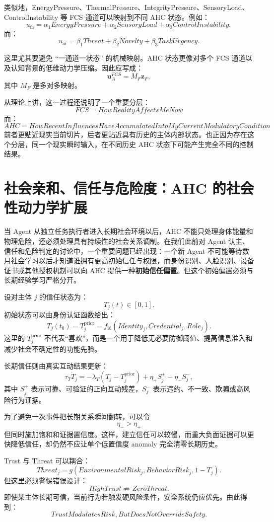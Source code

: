 类似地，EnergyPressure、ThermalPressure、IntegrityPressure、SensoryLoad、ControlInstability 等 FCS 通道可以映射到不同 AHC 状态。例如：
\[
u_{\mathrm{fa}}
=
\alpha_1
EnergyPressure
+
\alpha_2
SensoryLoad
+
\alpha_3
ControlInstability,
\]
而：
\[
u_{\mathrm{ar}}
=
\beta_1
Threat
+
\beta_2
Novelty
+
\beta_3
TaskUrgency.
\]

这里尤其要避免 ``一通道一状态'' 的机械映射。AHC 状态更像对多个 FCS 通道以及认知背景的低维动力学压缩。因此应写成：
\[
\mathbf u_A^{FCS}
=
M_F
\mathbf z_F,
\]
其中 $M_F$ 是多对多映射。

从理论上讲，这一过程还说明了一个重要分层：
\[
\boxed{
FCS
=
HowRealityAffectsMeNow
}
\]
而：
\[
\boxed{
AHC
=
HowRecentInfluencesHaveAccumulatedIntoMyCurrentModulatoryCondition
}
\]
前者更贴近现实当前切片，后者更贴近具有历史的主体内部状态。也正因为存在这个分层，同一个现实瞬时输入，在不同历史 AHC 状态下可能产生完全不同的控制结果。


\section{社会亲和、信任与危险度：AHC 的社会性动力学扩展}

当 Agent 从独立任务执行者进入长期社会环境以后，AHC 不能只处理身体能量和物理危险，还必须处理具有持续性的社会关系调制。在我们此前对 Agent 认主、信任和危险判定的讨论中，一个重要问题已经出现：一个新 Agent 不可能等待数月社会学习以后才知道谁拥有更高初始信任与权限，而身份识别、人脸识别、设备证书或其他授权机制可以向 AHC 提供一种\textbf{初始信任偏置}。但这个初始偏置必须与长期经验学习严格分开。

设对主体 $j$ 的信任状态为：
\[
T_j(t)\in[0,1].
\]
初始状态可以由身份认证函数给出：
\[
T_j(t_0)
=
T_j^{\mathrm{prior}}
=
f_{\mathrm{id}}(
Identity_j,
Credential_j,
Role_j
).
\]
这里的 $T_j^{\mathrm{prior}}$ 不代表``喜欢''，而是一个用于降低无必要防御阈值、提高信息准入和减少社会不确定性的功能先验。

长期信任则由真实互动结果更新：
\[
\tau_T
\dot T_j
=
-\lambda_T
\left(
T_j-T_j^{\mathrm{prior}}
\right)
+
\eta_+
S_j^+
-
\eta_-
S_j^-,
\]
其中 $S_j^+$ 表示可靠、可验证的正向互动残差，$S_j^-$ 表示违约、不一致、欺骗或高风险行为证据。

为了避免一次事件把长期关系瞬间翻转，可以令
\[
\eta_-
>
\eta_+
\]
但同时施加饱和和证据置信度。这样，建立信任可以较慢，而重大负面证据可以更快降低信任，却仍然不应让单个低置信度 anomaly 完全清零长期历史。

Trust 与 Threat 可以耦合：
\[
Threat_j
=
g(
EnvironmentalRisk_j,
BehaviorRisk_j,
1-T_j
).
\]
但这里必须警惕错误设计：
\[
HighTrust
\nRightarrow
ZeroThreat.
\]
即使某主体长期可信，当前行为若触发硬风险条件，安全系统仍应优先。由此得到：
\[
\boxed{
TrustModulatesRisk,
ButDoesNotOverrideSafety.
}
\]

